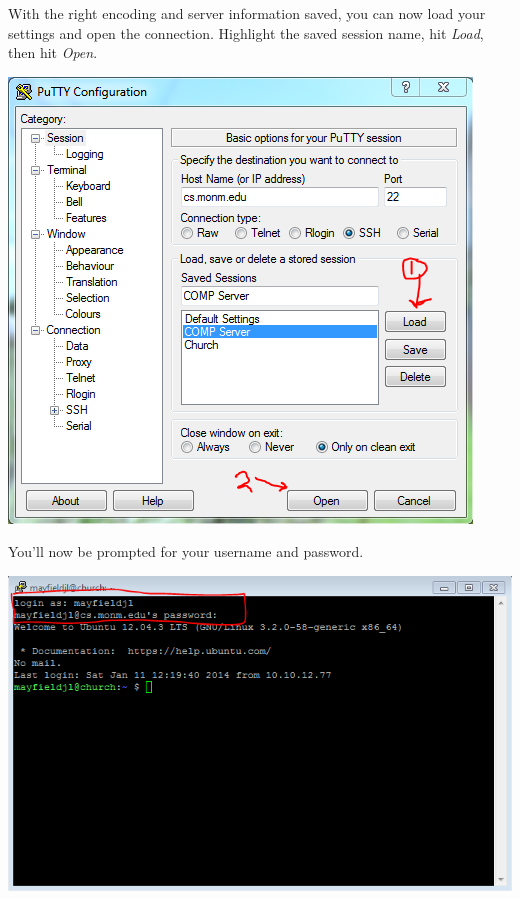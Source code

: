 \documentclass[]{tufte-handout}
\begin{document}
With the right encoding and server information saved, you can now load your settings and open the connection. Highlight the saved session name, hit \textit{Load}, then hit \textit{Open}. 

\vspace{.1in}
\begin{center}
\includegraphics[scale=.75]{Putty-LoadAndOpen.PNG}
\end{center}
\vspace{.1in}

You'll now be prompted for your username and password. 

\vspace{.1in}
\begin{center}
\includegraphics[scale=.75]{Putty-Login.PNG}
\end{center}
\vspace{.1in}
\end{document}
